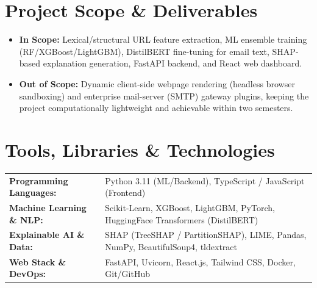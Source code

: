 \documentclass[10pt, a4paper]{article}
\begin{document}
\section{Project Scope \& Deliverables}
\begin{itemize}
    \item \textbf{In Scope:} Lexical/structural URL feature extraction, ML ensemble training (RF/XGBoost/LightGBM), DistilBERT fine-tuning for email text, SHAP-based explanation generation, FastAPI backend, and React web dashboard.
    \item \textbf{Out of Scope:} Dynamic client-side webpage rendering (headless browser sandboxing) and enterprise mail-server (SMTP) gateway plugins, keeping the project computationally lightweight and achievable within two semesters.
\end{itemize}

\section{Tools, Libraries \& Technologies}
\begin{tabularx}{\textwidth}{@{} >{\bfseries}l X @{}}
    \toprule
    Programming Languages: & Python 3.11 (ML/Backend), TypeScript / JavaScript (Frontend) \\
    Machine Learning \& NLP: & Scikit-Learn, XGBoost, LightGBM, PyTorch, HuggingFace Transformers (DistilBERT) \\
    Explainable AI \& Data: & SHAP (TreeSHAP / PartitionSHAP), LIME, Pandas, NumPy, BeautifulSoup4, tldextract \\
    Web Stack \& DevOps: & FastAPI, Uvicorn, React.js, Tailwind CSS, Docker, Git/GitHub \\
    \bottomrule
\end{tabularx}

\end{document}
